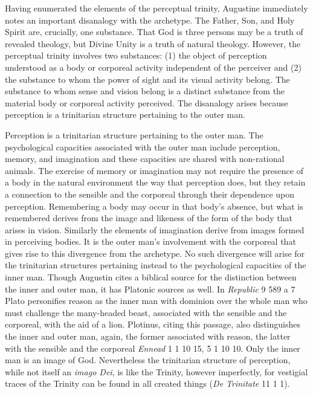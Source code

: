 \documentclass[12pt]{article}
\begin{document}
Having enumerated the elements of the perceptual trinity, Augustine immediately notes an important disanalogy with the archetype. The Father, Son, and Holy Spirit are, crucially, one substance. That God is three persons may be a truth of revealed theology, but Divine Unity is a truth of natural theology. However, the perceptual trinity involves two substances: (1) the object of perception understood as a body or corporeal activity independent of the perceiver and (2) the substance to whom the power of sight and its visual activity belong. The substance to whom sense and vision belong is a distinct substance from the material body or corporeal activity perceived. The disanalogy arises because perception is a trinitarian structure pertaining to the outer man.

Perception is a trinitarian structure pertaining to the outer man. The psychological capacities associated with the outer man include perception, memory, and imagination and these capacities are shared with non-rational animals. The exercise of memory or imagination may not require the presence of a body in the natural environment the way that perception does, but they retain a connection to the sensible and the corporeal through their dependence upon perception. Remembering a body may occur in that body's absence, but what is remembered derives from the image and likeness of the form of the body that arises in vision. Similarly the elements of imagination derive from images formed in perceiving bodies. It is the outer man's involvement with the corporeal that gives rise to this divergence from the archetype. No such divergence will arise for the trinitarian structures pertaining instead to the psychological capacities of the inner man. Though Augustin cites a biblical source for the distinction between the inner and outer man, it has Platonic sources as well. In \emph{Republic} 9 589 a 7 Plato personifies reason as the inner man with dominion over the whole man who must challenge the many-headed beast, associated with the sensible and the corporeal, with the aid of a lion. Plotinus, citing this passage, also distinguishes the inner and outer man, again, the former associated with reason, the latter with the sensible and the corporeal \emph{Ennead} 1 1 10 15, 5 1 10 10. Only the inner man is an image of God. Nevertheless the trinitarian structure of perception, while not itself an \emph{imago Dei}, is like the Trinity, however imperfectly, for vestigial traces of the Trinity can be found in all created things (\emph{De Trinitate} 11 1 1).
\end{document}
